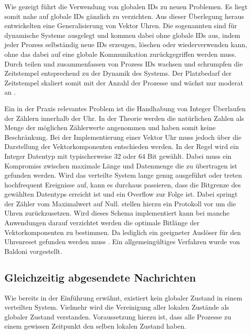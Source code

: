 
Wie gezeigt führt die Verwendung von globalen IDs zu neuen Problemen.
Es liegt somit nahe auf globale IDs gänzlich zu verzichten.
Aus dieser Überlegung heraus entwickelten  \cite{almeida2008treeclocks} eine Generalisierung von Vektor Uhren.
Die sogenannten  sind für dynamische Systeme ausgelegt und kommen dabei ohne globale IDs aus, indem jeder Prozess selbständig neue IDs erzeugen, löschen oder wiederverwenden kann, ohne das dabei auf eine globale Kommunikation zurückgegriffen werden muss.
Durch teilen und zusammenfassen von Prozess IDs wachsen und schrumpfen die Zeitstempel entsprechend zu der Dynamik des Systems.
Der Platzbedarf der Zeitstempel skaliert somit mit der Anzahl der Prozesse und wächst nur moderat an \cite{almeida2008treeclocks}.


Ein in der Praxis relevantes Problem ist die Handhabung von Integer Überlaufen der Zählern innerhalb der Uhr.
In der Theorie werden die natürlichen Zahlen als Menge der möglichen Zählerwerte angenommen und haben somit keine Beschränkung.
Bei der Implementierung einer Vektor Uhr muss jedoch über die Darstellung der Vektorkomponenten entschieden werden.
In der Regel wird ein Integer Datentyp mit typischerweise 32 oder 64 Bit gewählt.
Dabei muss ein Kompromiss zwischen maximale Länge und Datenmenge die zu übertragen ist gefunden werden.
Wird das verteilte System lange genug ausgeführt oder treten hochfrequent Ereignisse auf, kann es durchaus passieren, dass die Bitgrenze des gewählten Datentyps erreicht ist und ein Overflow zur Folge ist.
Dabei springt der Zähler vom Maximalwert auf Null.
 \cite{yen1997resetting} stellen hierzu ein Protokoll vor um die Uhren zurückzusetzen.
Wird dieses Schema implementiert kann bei manche Anwendungen darauf verzichtet werden die optimale Bitlänge der Vektorkomponenten zu bestimmen. Da lediglich ein geeigneter Auslöser für den Uhrenreset gefunden werden muss \cite{yen1997resetting}.
Ein allgemeingültiges Verfahren wurde von Baldoni \cite{baldoni1998positive} vorgestellt.

\subsection{Gleichzeitig abgesendete Nachrichten}
\label{lbl:consistency}
Wie bereits in der Einführung erwähnt, existiert kein globaler Zustand in einem verteilten System.
Vielmehr wird die Vereinigung aller lokalen Zustände als globaler Zustand verstanden.
Voraussetzung hierzu ist, dass alle Prozesse zu einem gewissen Zeitpunkt den selben lokalen Zustand haben.

